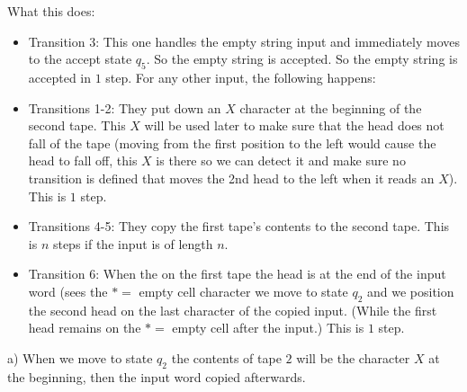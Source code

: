 What this does:
\begin{itemize}
    \item Transition 3: This one handles the empty string input and immediately moves to the accept state $q_5$. So the empty string is accepted. So the empty string is accepted in $1$ step. For any other input, the following happens:
    \item Transitions 1-2: They put down an $X$ character at the beginning of the second tape. This $X$ will be used later to make sure that the head does not fall of the tape (moving from the first position to the left would cause the head to fall off, this $X$ is there so we can detect it and make sure no transition is defined that moves the 2nd head to the left when it reads an $X$). This is $1$ step.
    \item Transitions 4-5: They copy the first tape's contents to the second tape. This is $n$ steps if the input is of length $n$.
    \item Transition 6: When the on the first tape the head is at the end of the input word (sees the $* =$ empty cell character we move to state $q_2$ and we position the second head on the last character of the copied input. (While the first head remains on the $* =$ empty cell after the input.) This is $1$ step.
\end{itemize}

a) When we move to state $q_2$ the contents of tape $2$ will be the character $X$ at the beginning, then the input word copied afterwards.

